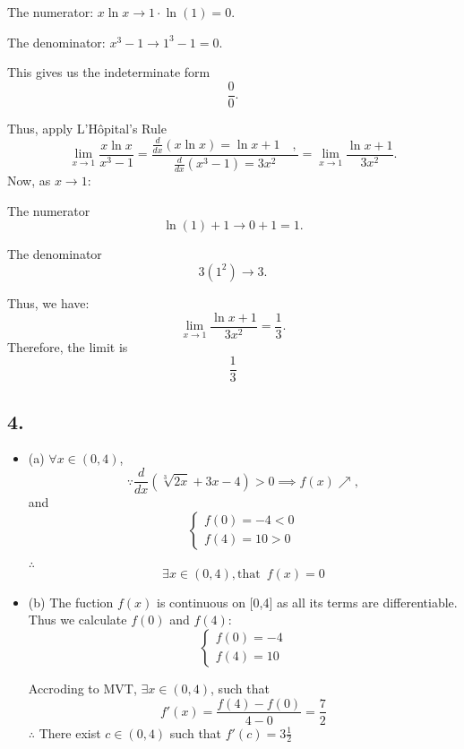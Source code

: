\documentclass[a4paper, 7pt]{article}
\begin{document}
\begin{itemize}
    The numerator: \(x \ln x \to 1 \cdot \ln(1) = 0\).

    The denominator: \(x^3 - 1 \to 1^3 - 1 = 0\).
    
    This gives us the indeterminate form 
    \[
    \frac{0}{0}.
    \]
    
    Thus, apply L'Hôpital's Rule
    \[
    \lim_{x \to 1} \frac{x \ln x}{x^3 - 1} = \frac{\frac{d}{dx}(x \ln x) = \ln x + 1 \quad,}{\frac{d}{dx}(x^3 - 1) = 3x^2}=\lim_{x \to 1} \frac{\ln x + 1}{3x^2}.
    \]
    Now, as \(x \to 1\):

    The numerator 
    \[
    \ln(1) + 1 \to 0 + 1 = 1.
    \]

    The denominator 
    \[
    3(1^2) \to 3.
    \]
    
    Thus, we have:
    \[
    \lim_{x \to 1} \frac{\ln x + 1}{3x^2} = \frac{1}{3}.
    \]
    Therefore, the limit is 
    \[
    \frac{1}{3}
    \]
\end{itemize}

\subsection*{4.}
\begin{itemize}
    \item (a)
    $\forall x \in (0,4)$,
    \[
    \because \frac{d}{dx} (\sqrt[3]{2x} + 3x - 4) > 0 \implies f(x) \nearrow,
    \]
    and 
    \[
    \left\{
    \begin{aligned}
    f(0) = -4 < 0 \\
    f(4) = 10 > 0
    \end{aligned}
    \right.
    \]

    $\therefore $
    \[
    \exists x \in (0,4) \mathrm{, that} \enspace f(x) = 0
    \]
     
    \item (b)
    The fuction $f(x)$ is continuous on [0,4] as all its terms are differentiable.\\
    Thus we calculate $f(0)$ and $f(4)$:
    \[
    \left\{
    \begin{aligned}
    f(0) = -4 \\
    f(4) = 10 
    \end{aligned}
    \right.
    \]

    Accroding to MVT, $\exists x \in (0,4)$, such that
    \[
    f'(x)= \frac{f(4) - f(0)}{4 - 0} = \frac{7}{2}
    \]
    $\therefore$
    There exist $c \in (0,4)$ such that $f'(c) = 3 \frac{1}{2}$

\end{itemize}
\end{document}
